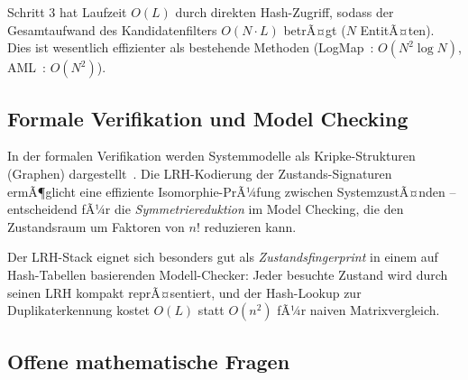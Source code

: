﻿\documentclass[a4paper,12pt]{article}
\theoremstyle{definition}
\begin{document}
Schritt 3 hat Laufzeit $O(L)$ durch direkten Hash-Zugriff, sodass der Gesamtaufwand
des Kandidatenfilters $O(N \cdot L)$ betrÃ¤gt ($N$ EntitÃ¤ten). Dies ist wesentlich
effizienter als bestehende Methoden (LogMap~\cite{jimenez2011}: $O(N^2 \log N)$,
AML~\cite{faria2013}: $O(N^2)$).

\subsection{Formale Verifikation und Model Checking}

In der formalen Verifikation werden Systemmodelle als Kripke-Strukturen (Graphen)
dargestellt~\cite{baier2008}. Die LRH-Kodierung der Zustands-Signaturen ermÃ¶glicht
eine effiziente Isomorphie-PrÃ¼fung zwischen SystemzustÃ¤nden -- entscheidend fÃ¼r
die \emph{Symmetriereduktion} im Model Checking, die den Zustandsraum um Faktoren
von $n!$ reduzieren kann.

Der LRH-Stack eignet sich besonders gut als \emph{Zustandsfingerprint} in einem
auf Hash-Tabellen basierenden Modell-Checker: Jeder besuchte Zustand wird durch
seinen LRH kompakt reprÃ¤sentiert, und der Hash-Lookup zur Duplikaterkennung
kostet $O(L)$ statt $O(n^2)$ fÃ¼r naiven Matrixvergleich.

\subsection{Offene mathematische Fragen}
\end{document}
